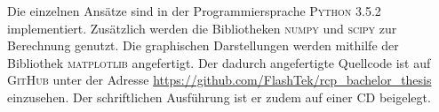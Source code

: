 Die einzelnen Ansätze sind in der Programmiersprache \textsc{Python 3.5.2} implementiert. Zusätzlich werden die Bibliotheken \textsc{numpy} und \textsc{scipy} zur Berechnung genutzt. Die graphischen Darstellungen werden mithilfe der Bibliothek \textsc{matplotlib} angefertigt. Der dadurch angefertigte Quellcode ist auf \textsc{GitHub} unter der Adresse \href{https://github.com/FlashTek/rcp\_bachelor\_thesis}{https://github.com/FlashTek/rcp\_bachelor\_thesis} einzusehen. Der schriftlichen Ausführung ist er zudem auf einer CD beigelegt.